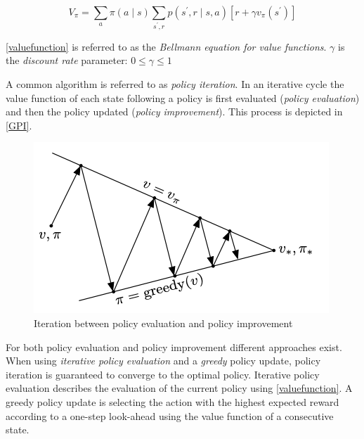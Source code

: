 \begin{equation}
V_\pi = \sum_{a} \pi(a \mid s) \sum_{s^{\prime}, r} p\left(s^{\prime}, r \mid s, a\right)\left[r+\gamma v_{\pi}\left(s^{\prime}\right)\right]
\label{valuefunction}
\end{equation}

\autoref{valuefunction} is referred to as the \emph{Bellmann equation for value functions}. $\gamma$ is the \emph{discount rate} parameter: $0\leq\gamma\leq1$ 

A common algorithm is referred to as \emph{policy iteration}. In an iterative cycle the value function of each state following a policy is first evaluated (\emph{policy evaluation}) and then the policy updated (\emph{policy improvement}). This process is depicted in \autoref{GPI}.

\begin{figure}[ht]
	\centering
	\includegraphics[width=.6\textwidth]{images/GPI2.png}
	\caption{\label{fig:bild2}Iteration between policy evaluation and policy improvement \autocite{Sutton2018}}
	\label{GPI}
\end{figure}

For both policy evaluation and policy improvement different approaches exist. When using \emph{iterative policy evaluation} and a \emph{greedy} policy update, policy iteration is guaranteed to converge to the optimal policy. Iterative policy evaluation describes the evaluation of the current policy using \autoref{valuefunction}. A greedy policy update is selecting the action with the highest expected reward according to a one-step look-ahead using the value function of a consecutive state. 
